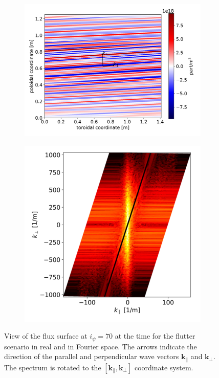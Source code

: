 \begin{figure}[H]\centering
	\begin{subfigure}[t]{0.55\textwidth}
		\centering
		\includegraphics[width=1\textwidth]{schemes/plot2Dtube_spec1_n_flutter.jpg}
		\label{fig:CIRC_fluxSurface_flutter_real}
	\end{subfigure}
	\begin{subfigure}[t]{0.4\textwidth}
		\centering
		\includegraphics[width=1\textwidth]{schemes/plotPowerSpectrum_spec1_n_flutter.jpg}
		\label{fig:CIRC_fluxSurface_flutter_Fourier}
	\end{subfigure}
	\caption{View of the flux surface at $i_\psi=70$ at the time for the flutter scenario in real and in Fourier space. The arrows indicate the direction of the parallel and perpendicular wave vectors $\textbf{k}_\parallel$ and $\textbf{k}_\perp$. The spectrum is rotated to the $[\textbf{k}_\parallel,\textbf{k}_\perp]$ coordinate system.}
	\label{fig:CIRC_fluxSurface_flutter}
\end{figure}


